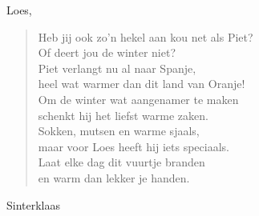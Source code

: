 \documentclass[12pt]{brief}
\date{4 december 2004}
\begin{document}
\begin{letter}{Loes,}

\opening{}


\begin{verse}

Heb jij ook zo'n hekel aan kou net als Piet?\\
Of deert jou de winter niet?\\
Piet verlangt nu al naar Spanje,\\
heel wat warmer dan dit land van Oranje!\\[0.5em]

Om de winter wat aangenamer te maken\\
schenkt hij het liefst warme zaken.\\
Sokken, mutsen en warme sjaals,\\
maar voor Loes heeft hij iets speciaals.\\
Laat elke dag dit vuurtje branden\\
en warm dan lekker je handen.\\[2em]

\end{verse}


Sinterklaas


\closing{}

\end{letter}
\end{document}

